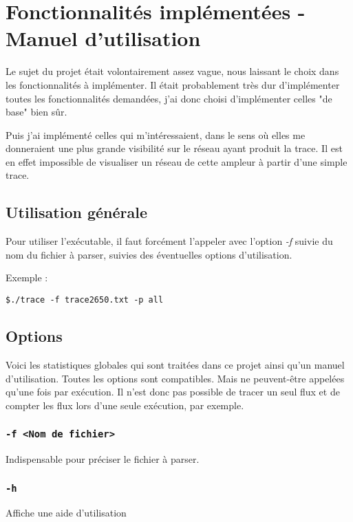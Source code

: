 \documentclass[
10pt, %
a4paper, %
oneside, %
headinclude,footinclude, %
BCOR5mm, %
]{scrartcl}
\begin{document}

\section{Fonctionnalités implémentées - Manuel d'utilisation}
Le sujet du projet était volontairement assez vague, nous laissant le choix dans les fonctionnalités à implémenter. Il était probablement très dur d'implémenter toutes les fonctionnalités demandées, j'ai donc choisi d'implémenter celles "de base" bien sûr.

Puis j'ai implémenté celles qui m'intéressaient, dans le sens où elles me donneraient une plus grande visibilité sur le réseau ayant produit la trace. Il est en effet impossible de visualiser un réseau de cette ampleur à partir d'une simple trace.
\subsection{Utilisation générale}
	Pour utiliser l'exécutable, il faut forcément l'appeler avec l'option \textit{-f} suivie du nom du fichier à parser, suivies des éventuelles options d'utilisation.
	
	Exemple :
	
	 \centerline{\texttt{\$./trace -f trace2650.txt -p all}}

\subsection{Options}
	Voici les statistiques globales qui sont traitées dans ce projet ainsi qu'un manuel d'utilisation. Toutes les options sont compatibles. Mais ne peuvent-être appelées qu'une fois par exécution. Il n'est donc pas possible de tracer un seul flux et de compter les flux lors d'une seule exécution, par exemple.
	


\subsubsection{\texttt{-f <Nom de fichier>}}
  Indispensable pour préciser le fichier à parser.	

\subsubsection{\texttt{-h}}
Affiche une aide d'utilisation
\end{document}
